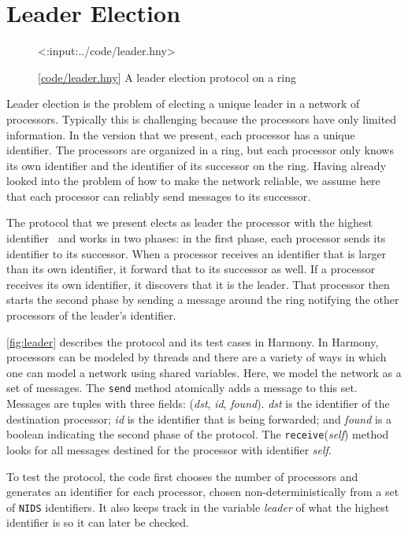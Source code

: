 \documentclass{report}
\newcommand{\harmonylink}[1]{%
[\href{https://harmony.cs.cornell.edu/#1}{\underline{#1}}]%
}
\newenvironment{code}{
\tcolorbox
}{
\endtcolorbox
}
\begin{document}
{\chapter{Leader Election}
\label{ch:leader}

\begin{figure}
\begin{code}
<{:input:../code/leader.hny}>
\end{code}
\caption{\harmonylink{code/leader.hny} A leader election protocol on a ring}
\label{fig:leader}
\end{figure}

Leader election is the problem of electing a unique leader in a
network of processors.  Typically this is challenging because the
processors have only limited information.  In the version that we
present, each processor has a unique identifier.  The processors
are organized in a ring, but each processor only knows its own
identifier and the identifier of its successor on the ring.  Having
already looked into the problem of how to make the network reliable,
we assume here that each processor can reliably send messages to
its successor.

The protocol that we present elects as leader the processor with the
highest identifier~\cite{CR79} and works in two phases: in the first
phase, each processor sends its identifier to its successor.  When
a processor receives an identifier that is larger than its own
identifier, it forward that to its successor as well.  If a processor
receives its own identifier, it discovers that it is the leader.  That
processor then starts the second phase by sending a message around the
ring notifying the other processors of the leader's identifier.

\autoref{fig:leader} describes the protocol and its test cases in Harmony.
In Harmony, processors can be modeled by threads and there are a variety of ways in
which one can model a network using shared variables.
Here, we model the network as a set of messages.
The \texttt{send} method atomically adds a message to this set.
Messages are tuples with three fields:
(\textit{dst}, \textit{id}, \textit{found}).
\textit{dst} is the identifier of the destination processor;
\textit{id} is the identifier that is being forwarded; and
\textit{found} is a boolean indicating the second phase of the protocol.
The \texttt{receive}(\textit{self}) method looks for all messages
destined for the processor with identifier \textit{self}.

To test the protocol, the code first chooses the number of processors
and generates an identifier for each
processor, chosen non-deterministically from a set of \texttt{NIDS}
identifiers.  It also keeps track in the variable \textit{leader} of
what the highest identifier is so it can later be checked.

}
\end{document}

